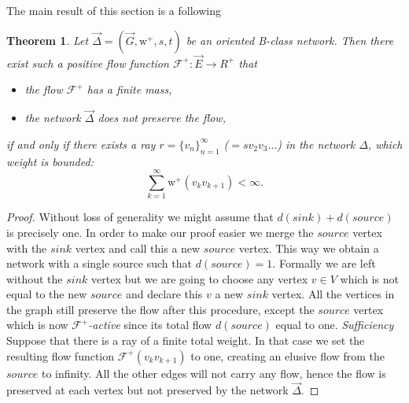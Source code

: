 \documentclass[12pt]{article}
\newtheorem{theorem}{Theorem}
\theoremstyle{definition}
\newcommand{\seq}[1]{\{{#1}_n\}_{n=1}^\infty}
\newcommand{\wtp}{\mathrm{w}^{+}}
\newcommand{\flowpos}{\mathcal{F}^{+}}
\newcommand{\source}{\mathit{source}}
\newcommand{\sink}{\mathit{sink}}
\newcommand{\net}{\Delta}
\newcommand{\onet}{\vec{\Delta}}
\numberwithin{remark}{section}
\numberwithin{theorem}{section}
\numberwithin{prop}{section}
\numberwithin{equation}{section}
\numberwithin{lemma}{section}
\numberwithin{prop_under_lemma}{lemma}
\begin{document}
    The main result of this section is a following
    \begin{theorem}
      Let $\onet = (\vec{G}, \wtp, s, t)$ be an oriented B-class network.
      Then there exist such a positive flow function $\flowpos: \vec{E} \to R^{+}$ that
      \begin{itemize}
        \item the flow $\flowpos$ has a finite mass,
        \item the network $\onet$ does not preserve the flow,
      \end{itemize}
        if and only if there exists a ray $r = \seq{v}$ ($=sv_2v_3\dots$)
        in the network $\net$, which weight is bounded:
        $$
          \sum_{k=1}^\infty \wtp(v_k v_{k+1}) < \infty.
        $$
    \end{theorem}
    \begin{proof}
      Without loss of generality we might assume that $d(\sink) + d(\source)$ is precisely one.
      In order to make our proof easier we merge the $\source$ vertex with the $\sink$ vertex and call this a
        new $\source$ vertex.
      This way we obtain a network with a single source such that $d(\source) = 1$.
      Formally we are left without the $\sink$ vertex but we are going to choose any vertex $v \in V$ which
        is not equal to the new $\source$ and declare this $v$ a new $\sink$ vertex.
      All the vertices in the graph still preserve the flow after this procedure, except the $\source$ vertex
        which is now \emph{$\flowpos$-active} since its total flow $d(\source)$ equal to one.
      \noindent\textit{Sufficiency}
      Suppose that there is a ray of a finite total weight. 
      In that case we set the resulting flow function $\flowpos(v_k v_{k+1})$ to one, creating an elusive flow
        from the $\source$ to infinity. All the other edges will not carry any flow, hence the flow is preserved
        at each vertex but not preserved by the network $\onet$.


\end{proof}
\end{document}
